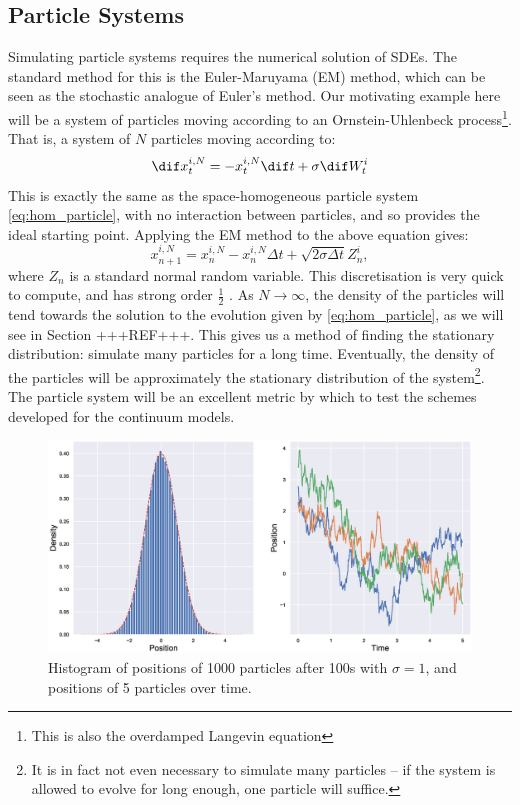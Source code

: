 \documentclass[11pt, a4paper, draft]{article}
\newcommand{\Dt}{\Delta t}
\begin{document}
        \subsection{Particle Systems}
            Simulating particle systems requires the numerical solution of SDEs. The standard method for this is the Euler-Maruyama (EM) method, which can be seen as the stochastic analogue of Euler's method. Our motivating example here will be a system of particles moving according to an Ornstein-Uhlenbeck process\footnote{This is also the overdamped Langevin equation}. That is, a system of $N$ particles moving according to:
            \begin{equation}
                \dif x^{i,N}_t = - x^{i,N}_t \dif t + \sigma \dif W^i_t
            \end{equation}
            This is exactly the same as the space-homogeneous particle system \eqref{eq:hom_particle}, with no interaction between particles, and so provides the ideal starting point. Applying the EM method to the above equation gives:
            \[ x^{i,N}_{n+1} = x^{i,N}_n -  x^{i,N}_n\Dt + \sqrt{2\sigma\Dt}Z^i_n,  \]
		    where $Z_n$ is a standard normal random variable. This discretisation is very quick to compute, and has strong order $\frac{1}{2}$ \cite{Higham01}. As $N \to \infty$, the density of the particles will tend towards the solution to the evolution given by \eqref{eq:hom_particle}, as we will see in Section +++REF+++. This gives us a method of finding the stationary distribution: simulate many particles for a long time. Eventually, the density of the particles will be approximately the stationary distribution of the system\footnote{It is in fact not even necessary to simulate many particles -- if the system is allowed to evolve for long enough, one particle will suffice.}. The particle system will be an excellent metric by which to test the schemes developed for the continuum models.
            \begin{figure}
                \centering
                \includegraphics[width=0.7\linewidth]{Figures/OUparticletraj}
                \caption{Histogram of positions of 1000 particles after 100s with $\sigma = 1$, and positions of 5 particles over time.}
                \label{fig:ouparticletraj}
            \end{figure}
            
\end{document}
